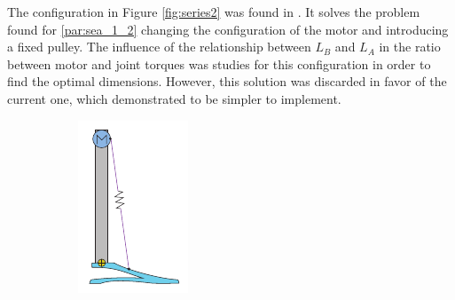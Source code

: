 The configuration in Figure \ref{fig:series2} was found in \cite{biobiped}.
It solves the problem found for \ref{par:sea_1_2} changing the configuration of the motor and introducing a fixed pulley.
The influence of the relationship between $L_{B}$ and $L_{A}$ in the ratio between motor and joint torques was studies for this configuration in order to find the optimal dimensions.
However, this solution was discarded in favor of the current one, which demonstrated to be simpler to implement.

\begin{figure}[htb]
\centering
  \begin{subfigure}{.19\textwidth}
    \centering
    \includegraphics[width=\linewidth]{figures/illustration_serial_direct_i.pdf}

\end{subfigure}
\end{figure}
